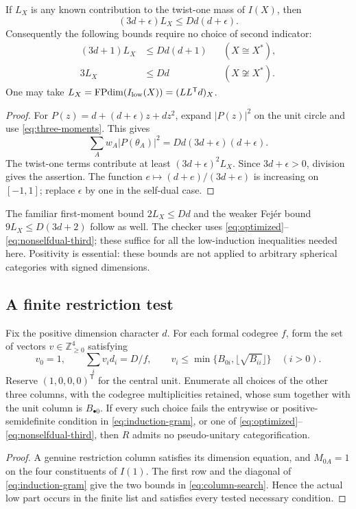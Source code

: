 \begin{proposition}\label{prop:optimized-moment}
If $L_X$ is any known contribution to the twist-one mass of $I(X)$, then
\[
 (3d+\epsilon)L_X\leq Dd(d+\epsilon).
\]
Consequently the following bounds require no choice of second indicator:
\begin{align}
 (3d+1)L_X&\leq Dd(d+1)&& (X\cong X^*),\label{eq:optimized}\\
 3L_X&\leq Dd&& (X\not\cong X^*).\label{eq:nonselfdual-third}
\end{align}
One may take $L_X=\operatorname{FPdim}(I_{\rm low}(X))=(LL^{\mathsf T}d)_X$.
\end{proposition}
\begin{proof}
For $P(z)=d+(d+\epsilon)z+dz^2$, expand $|P(z)|^2$ on the unit circle
and use \eqref{eq:three-moments}. This gives
\[
 \sum_Aw_A|P(\theta_A)|^2=Dd(3d+\epsilon)(d+\epsilon).
\]
The twist-one terms contribute at least $(3d+\epsilon)^2L_X$.
Since $3d+\epsilon>0$, division gives the assertion.
The function $e\mapsto(d+e)/(3d+e)$ is increasing on $[-1,1]$;
replace $\epsilon$ by one in the self-dual case.
\end{proof}

The familiar first-moment bound $2L_X\leq Dd$ and the weaker Fej\'er
bound $9L_X\leq D(3d+2)$ follow as well. The checker uses
\eqref{eq:optimized}--\eqref{eq:nonselfdual-third}; these suffice for
all the low-induction inequalities needed here. Positivity is essential:
these bounds are not applied to arbitrary spherical categories with signed
dimensions.

\subsection{A finite restriction test}
\begin{proposition}\label{prop:low-certificate}
Fix the positive dimension character $d$. For each formal codegree $f$,
form the set of vectors $v\in\mathbb Z_{\geq0}^4$ satisfying
\begin{equation}\label{eq:column-search}
 v_0=1,\qquad \sum_i v_id_i=D/f,\qquad
 v_i\leq\min\{B_{0i},\lfloor\sqrt{B_{ii}}\rfloor\}\quad(i>0).
\end{equation}
Reserve $(1,0,0,0)^{\mathsf T}$ for the central unit. Enumerate all choices
of the other three columns, with the codegree multiplicities retained,
whose sum together with the unit column is $B_{\bullet0}$.
If every such choice fails the entrywise or positive-semidefinite condition
in \eqref{eq:induction-gram}, or one of
\eqref{eq:optimized}--\eqref{eq:nonselfdual-third}, then $R$ admits no
pseudo-unitary categorification.
\end{proposition}
\begin{proof}
A genuine restriction column satisfies its dimension equation, and
$M_{0A}=1$ on the four constituents of $I(1)$. The first row and the diagonal
of \eqref{eq:induction-gram} give the two bounds in
\eqref{eq:column-search}. Hence the actual low part occurs in the finite
list and satisfies every tested necessary condition.
\end{proof}

